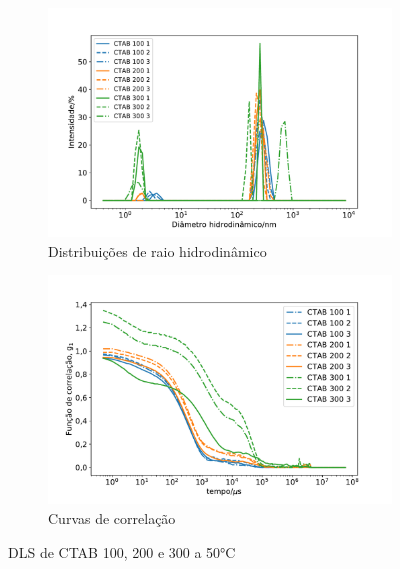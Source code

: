 \begin{figure}[H]
	\begin{subfigure}{0.47\textwidth}
		\centering
		\includegraphics[width=\textwidth]{imagens/dls/ctab_distrib}
		\caption{Distribuições de raio hidrodinâmico}
		\label{fig:DLS_ctab_distrib}
	\end{subfigure} \qquad %
	\begin{subfigure}{0.47\textwidth}
		\centering
		\includegraphics[width=\textwidth]{imagens/dls/ctab_CC}
		\caption{Curvas de correlação}
		\label{fig:DLS_ctab_cc}
	\end{subfigure}
	\caption{DLS de CTAB 100, 200 e 300 \mM{} a 50°C}
	\label{fig:DLS_ctab}
\end{figure}

